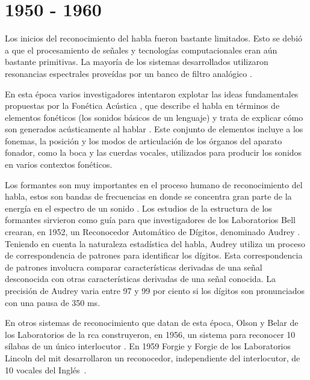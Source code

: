 \section{1950 - 1960}
\label{sec:50s}

Los inicios del reconocimiento del habla fueron bastante limitados. Esto se debi\'o a que el procesamiento 
de se\~{n}ales y tecnolog\'{i}as computacionales eran a\'un bastante primitivas. 
La mayor\'{i}a de los sistemas desarrollados utilizaron resonancias espectrales prove\'{i}das por 
un banco de filtro anal\'{o}gico \cite{Furui50Years2004}.
 
En esta \'{e}poca varios investigadores intentaron
explotar las ideas fundamentales propuestas por la Fon\'{e}tica Ac\'{u}stica \cite{AnusuyaSpeech2009}, que
describe el habla en t\'{e}rminos de elementos fon\'{e}ticos (los sonidos b\'{a}sicos de un lenguaje) y trata de
explicar c\'{o}mo son generados ac\'{u}sticamente al hablar \cite{JuangAutomaticSpeech}. 
Este conjunto de elementos incluye a los fonemas, la posici\'on y los modos de articulaci\'on de los \'organos
del aparato fonador, como la boca y las cuerdas vocales, utilizados para producir los sonidos 
en varios contextos fon\'{e}ticos.

Los formantes son muy importantes en el proceso humano de reconocimiento del habla, estos son bandas de frecuencias en 
donde se concentra gran parte de la energ\'{i}a en el espectro de un sonido \cite{HawkinsAcoustic2009}. Los estudios
de la estructura de los formantes sirvieron como gu\'{i}a para que investigadores de los Laboratorios Bell crearan,
en 1952, un Reconocedor Autom\'{a}tico de D\'{i}gitos, denominado Audrey \cite{DavisAutomatic1952}. 
Teniendo en cuenta la naturaleza estad\'{i}stica del habla, Audrey utiliza un proceso de correspondencia de patrones
para identificar los d\'{i}gitos. Esta correspondencia de patrones involucra comparar caracter\'{i}sticas derivadas
de una se\~{n}al desconocida con otras caracter\'{i}sticas derivadas de una se\~{n}al conocida. La precisi\'{o}n de
Audrey varia entre 97 y 99 por ciento si los d\'{i}gitos son pronunciados con una pausa de 350 ms.

En otros sistemas de reconocimiento que datan de esta \'{e}poca, Olson y Belar de los Laboratorios 
de la \gls{rca} construyeron, en 1956, un sistema para reconocer 10 s\'{i}labas de un \'{u}nico 
interlocutor \cite{OlsonPhonetic1956}. En 1959 Forgie y Forgie de los Laboratorios Lincoln del \gls{mit} 
desarrollaron un reconocedor, independiente del interlocutor, de 10 vocales del 
\mbox{Ingl\'{e}s \cite{ForgieResults1959}}.
